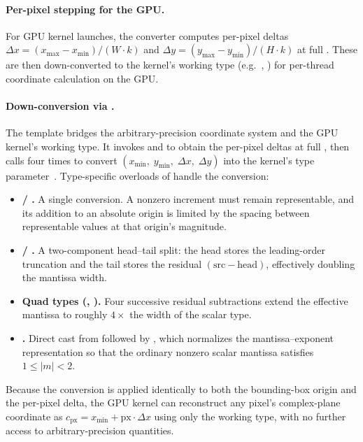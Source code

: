 \paragraph{Per-pixel stepping for the GPU.}
For GPU kernel launches, the converter computes per-pixel deltas
$\Delta x = (x_{\max}-x_{\min})/(W \cdot k)$ and
$\Delta y = (y_{\max}-y_{\min})/(H \cdot k)$ at full
.  These are then down-converted to the
kernel's working type (e.g.\ , ) for
per-thread coordinate calculation on the GPU.

\paragraph{Down-conversion via .}
The  template bridges the arbitrary-precision
coordinate system and the GPU kernel's working type.  It invokes
 and  to obtain the per-pixel deltas
at full , then calls  four times
to convert $(x_{\min},\; y_{\min},\; \Delta x,\; \Delta y)$ into the
kernel's type parameter~.  Type-specific overloads of
 handle the conversion:
\begin{itemize}
  \item \textbf{ / .}  A single
         conversion. A nonzero increment must
        remain representable, and its addition to an absolute origin is limited
        by the spacing between representable values at that origin's magnitude.
  \item \textbf{ / .}  A two-component
        head--tail split: the head stores the leading-order truncation
        and the tail stores the residual $(\text{src} - \text{head})$,
        effectively doubling the mantissa width.
  \item \textbf{Quad types (, ).}
        Four successive residual subtractions extend the effective mantissa
        to roughly $4\times$ the width of the scalar type.
  \item \textbf{.}  Direct cast from
         followed by , which
        normalizes the mantissa--exponent representation so that the
        ordinary nonzero scalar mantissa satisfies $1\le |m|<2$.
\end{itemize}
Because the conversion is applied identically to both the bounding-box
origin and the per-pixel delta, the GPU kernel can reconstruct any
pixel's complex-plane coordinate as
$c_{\text{px}} = x_{\min} + \text{px}\cdot\Delta x$ using only the
working type, with no further access to arbitrary-precision quantities.

